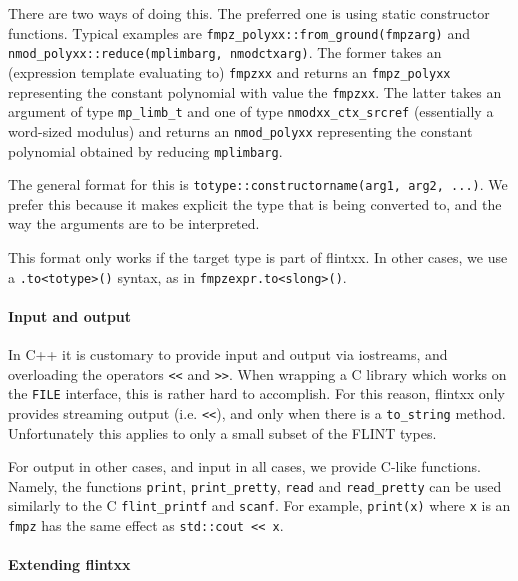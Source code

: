 \documentclass[a4paper,10pt]{book}
\newcommand{\code}{\lstinline}
\begin{document}
{{There are two ways of doing this. The preferred one is using static constructor
functions. Typical examples are
\code{fmpz_polyxx::from_ground(fmpzarg)} and\\
\code{nmod_polyxx::reduce(mplimbarg, nmodctxarg)}. The former takes an
(expression template evaluating to) \code{fmpzxx} and returns an
\code{fmpz_polyxx} representing the constant polynomial with value the
\code{fmpzxx}. The latter takes an argument of type \code{mp_limb_t} and one of
type \code{nmodxx_ctx_srcref} (essentially a word-sized modulus) and returns an
\code{nmod_polyxx} representing the constant polynomial obtained by reducing
\code{mplimbarg}.

The general format for this is \code{totype::constructorname(arg1, arg2, ...)}.
We prefer this because it makes explicit the type that is being converted to,
and the way the arguments are to be interpreted.

This format only works if the target type is part of flintxx. In other cases, we
use a \code{.to<totype>()} syntax, as in \code{fmpzexpr.to<slong>()}.

\paragraph{Input and output}

In C++ it is customary to provide input and output via iostreams, and
overloading the operators \code{<<} and \code{>>}. When wrapping a C library
which works on the \code{FILE} interface, this is rather hard to accomplish. For
this reason, flintxx only provides streaming output (i.e. \code{<<}), and only
when there is a \code{to_string} method. Unfortunately this applies to only a
small subset of the FLINT types.

For output in other cases, and input in all cases, we provide C-like functions.
Namely, the functions \code{print}, \code{print_pretty}, \code{read} and
\code{read_pretty} can be used similarly to the C \code{flint_printf} and \code{scanf}.
For example, \code{print(x)} where \code{x} is an \code{fmpz} has the same
effect as \code{std::cout << x}.

\paragraph{Extending flintxx}

}}
\end{document}
